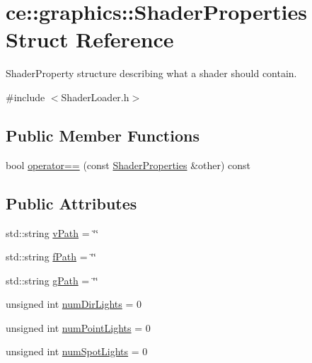 \hypertarget{structce_1_1graphics_1_1_shader_properties}{}\section{ce\+:\+:graphics\+:\+:Shader\+Properties Struct Reference}
\label{structce_1_1graphics_1_1_shader_properties}


Shader\+Property structure describing what a shader should contain.  




{\ttfamily \#include $<$Shader\+Loader.\+h$>$}

\subsection*{Public Member Functions}
\begin{DoxyCompactItemize}
\item 
bool \hyperlink{structce_1_1graphics_1_1_shader_properties_a36dd41572daba1bed598dee9fbc24cdb}{operator==} (const \hyperlink{structce_1_1graphics_1_1_shader_properties}{Shader\+Properties} \&other) const
\end{DoxyCompactItemize}
\subsection*{Public Attributes}
\begin{DoxyCompactItemize}
\item 
std\+::string \hyperlink{structce_1_1graphics_1_1_shader_properties_a7c292a15c7a6d732c23a859448fadef9}{v\+Path} = \char`\"{}\char`\"{}
\item 
std\+::string \hyperlink{structce_1_1graphics_1_1_shader_properties_a38bb1cbff534647f4e2317e6b00ff14f}{f\+Path} = \char`\"{}\char`\"{}
\item 
std\+::string \hyperlink{structce_1_1graphics_1_1_shader_properties_af1c3a63df0b9520a9cbb00022a5cf32a}{g\+Path} = \char`\"{}\char`\"{}
\item 
unsigned int \hyperlink{structce_1_1graphics_1_1_shader_properties_a7d54a6b908a22b03048b931c68bb1b73}{num\+Dir\+Lights} = 0
\item 
unsigned int \hyperlink{structce_1_1graphics_1_1_shader_properties_a67afcd1acec57748e14ed1ee9705f2bf}{num\+Point\+Lights} = 0
\item 
unsigned int \hyperlink{structce_1_1graphics_1_1_shader_properties_a2345e569f945babf05778559f639eac4}{num\+Spot\+Lights} = 0
\end{DoxyCompactItemize}


